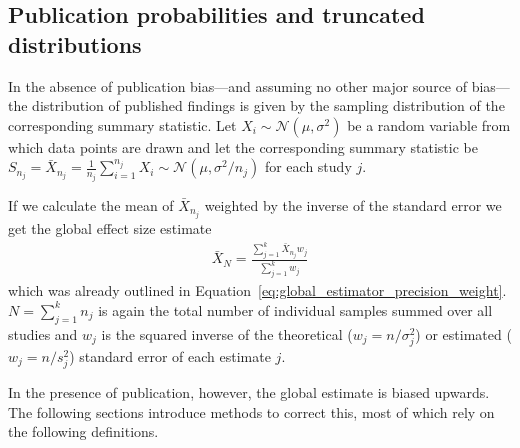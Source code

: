 \subsection{Publication probabilities and truncated distributions}
\label{subsec:pub_prob and trunc_dist}
In the absence of publication bias---and assuming no other major source of bias---the distribution of published findings is given by the sampling distribution of the corresponding summary statistic. Let ${X_i \sim \mathcal{N}(\mu,\sigma^2)}$ be a random variable from which data points are drawn and let the corresponding summary statistic be ${S_{n_j} = \bar{X}_{n_j} = \frac{1}{n_j} \sum_{i=1}^{n_j} X_i \sim \mathcal{N}(\mu, \sigma^2/n_j)}$ for each study $j$.\par
If we calculate the mean of ${\bar{X}_{n_j}}$ weighted by the inverse of the standard error we get the global effect size estimate 
\begin{align*}
    \bar{X}_N = \frac{\sum_{j=1}^k \bar{X}_{n_j}w_j}{\sum_{j=1}^k w_j}
\end{align*}
which was already outlined in Equation~\ref{eq:global_estimator_precision_weight}. ${N = \sum_{j=1}^k n_j}$ is again the total number of individual samples summed over all studies and $w_j$ is the squared inverse of the theoretical ($w_j = n/\sigma_j^2$) or estimated ($w_j = n/s_j^2$) standard error of each estimate $j$.\par
In the presence of publication, however, the global estimate is biased upwards. The following sections introduce methods to correct this, most of which rely on the following definitions.\
